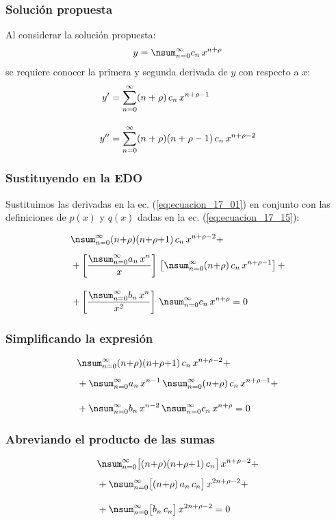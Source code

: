 \documentclass[12pt]{beamer}
\begin{document}
\begin{frame}
\frametitle{Solución propuesta}
Al considerar la solución propuesta:
\pause
\begin{align*}
y = \nsum_{n=0}^{\infty} c_{n} \, x^{n+\rho}
\end{align*}
\pause
se requiere conocer la primera y  segunda derivada de $y$ con respecto a $x$:
\begin{align*}
{y}^{\prime} &= \sum_{n=0}^{\infty} (n + \rho) \, c_{n} \, x^{n+\rho-1} \\[1em]
{y}^{\prime \prime} &= \sum_{n=0}^{\infty} (n + \rho)(n + \rho - 1) \, c_{n} \, x^{n+\rho-2}
\end{align*}
\end{frame}
\begin{frame}
\frametitle{Sustituyendo en la EDO}
Sustituimos las derivadas en la ec. (\ref{eq:ecuacion_17_01}) en conjunto con las definiciones de $p(x)$ y $q(x)$ dadas en la ec. (\ref{eq:ecuacion_17_15}):
\end{frame}
\begin{frame}
\begin{align*}
&\nsum_{n=0}^{\infty} (n {+} \rho)(n {+} \rho {+} 1) \, c_{n} \, x^{n+\rho-2} + \\[0.5em] 
&+ \left[ \dfrac{\displaystyle \nsum_{n=0}^{\infty} a_{n} \, x^{n}}{x} \right] \, \left[ \nsum_{n=0}^{\infty} (n {+} \rho) \, c_{n} \, x^{n+\rho-1} \right] + \\[1em]
&+ \left[ \dfrac{\displaystyle \nsum_{n=0}^{\infty} b_{n} \, x^{n}}{x^{2}} \right] \, \nsum_{n=0}^{\infty} c_{n} \, x^{n+\rho} = 0
\end{align*}
\end{frame}
\begin{frame}
\frametitle{Simplificando la expresión}
\begin{align*}
&\nsum_{n=0}^{\infty} (n {+} \rho)(n {+} \rho {+} 1) \, c_{n} \, x^{n+\rho-2} + \\[0.5em]
&+ \nsum_{n=0}^{\infty} a_{n} \, x^{n-1} \, \nsum_{n=0}^{\infty} (n {+} \rho) \, c_{n} \, x^{n+\rho-1} + \\[1em]
&+ \nsum_{n=0}^{\infty} b_{n} \, x^{n-2} \, \nsum_{n=0}^{\infty} c_{n} \, x^{n+\rho} = 0
\end{align*}
\end{frame}
\begin{frame}
\frametitle{Abreviando el producto de las sumas}
\begin{align*}
&\nsum_{n=0}^{\infty} \big[ (n {+} \rho)(n {+} \rho {+} 1) \, c_{n} \big] \, x^{n+\rho-2} + \\[0.5em] 
&+ \nsum_{n=0}^{\infty} \big[ (n {+} \rho) \, a_{n} \, c_{n} \big] \, x^{2n+\rho-2} + \\[1em]
&+ \nsum_{n=0}^{\infty} \big[ b_{n} \, c_{n} \big] \, x^{2n+\rho-2} = 0
\end{align*}
\end{frame}
\end{document}
